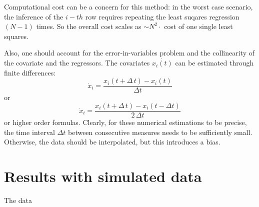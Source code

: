 Computational cost can be a concern for this method: in the worst case scenario, the inference of the $i-th$ row requires repeating the least suqares regression $(N-1)$ times. So the overall cost scales as $\sim N^2 \cdot$ cost of one single least squares.

Also, one should account for the error-in-variables problem and the collinearity of the covariate and the regressors.
The covariates $\dot{x_i(t)}$ can be estimated through finite differences:
\begin{equation*}
    \dot{x}_i = \frac{x_i(t+\Delta\,t) - x_i(t)}{\Delta t}
\end{equation*}
or 
\begin{equation*}
    \dot{x}_i = \frac{x_i(t+\Delta\,t) - x_i(t-\Delta t)}{2\,\Delta t} 
\end{equation*}
or higher order formulas.
Clearly, for these numerical estimations to be precise, the time interval $\Delta t$ between consecutive measures needs to be sufficiently small. Otherwise, the data should be interpolated, but this introduces a bias. 


\section{Results with simulated data}

The data 

